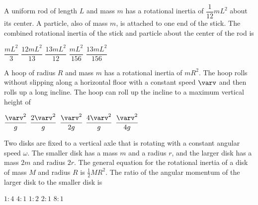 \documentclass{../../../oss-classkick-exam}
\begin{document}
\begin{multicols*}{2}
\begin{questions}
    \question A uniform rod of length $L$ and mass $m$ has a rotational inertia
    of $\dfrac1{12}mL^2$ about its center. A particle, also of mass $m$, is
    attached to one end of the stick. The combined rotational inertia of the
    stick and particle about the center of the rod is
    \begin{center}
    \end{center}
    \begin{choices}
      \choice$\dfrac{mL^2}{3}$
      \choice$\dfrac{12mL^2}{13}$
      \choice$\dfrac{13mL^2}{12}$
      \choice$\dfrac{mL^2}{156}$
      \choice$\dfrac{13mL^2}{156}$
    \end{choices}

    \question A hoop of radius $R$ and mass $m$ has a rotational inertia of
    $mR^2$. The hoop rolls without slipping along a horizontal floor with a
    constant speed $\varv$ and then rolls up a long incline. The hoop can roll
    up the incline to a maximum vertical height of
    \begin{center}
    \end{center}
    \begin{choices}
      \choice$\dfrac{\varv^2}{g}$
      \choice$\dfrac{2\varv^2}{g}$
      \choice$\dfrac{\varv^2}{2g}$
      \choice$\dfrac{4\varv^2}{g}$
      \choice$\dfrac{\varv^2}{4g}$
    \end{choices}
    
    \question Two disks are fixed to a vertical axle that is rotating with a
    constant angular speed $\omega$. The smaller disk has a mass $m$ and a
    radius $r$, and the larger disk has a mass $2m$ and radius $2r$. The
    general equation for the rotational inertia of a disk of mass $M$ and
    radius $R$ is $\frac12MR^2$. The ratio of the angular momentum of the
    larger disk to the smaller disk is
    \begin{choices}
      \choice $1:4$
      \choice $4:1$
      \choice $1:2$
      \choice $2:1$
      \choice $8:1$
    \end{choices}
    \columnbreak


\end{questions}
\end{multicols*}
\end{document}
